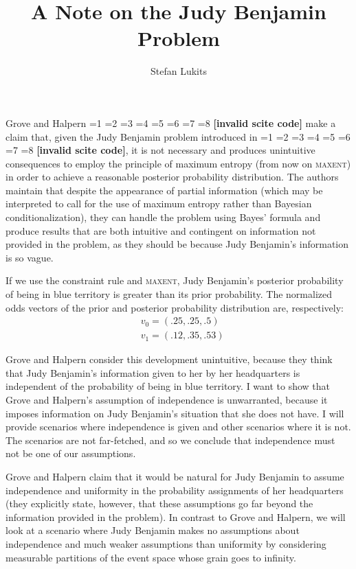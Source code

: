 \documentclass[11pt]{article}
\newcommand{\nootag}{}
\newif\ifNumericalOrYear
\newcommand{\PageP}{p.~}
\newcommand{\PageP}{}
\newcommand{\scite}[3]{\ifnum#1=1\ifNumericalOrYear\citep{#2}\else\citeyearpar{#2}\fi\else
\ifnum#1=2\ifNumericalOrYear\citep[#3]{#2}\else\citep[{\PageP}#3]{#2}\fi\else
\ifnum#1=3\ifNumericalOrYear(\citet[#3]{#2})\else\citep[{\PageP}#3]{#2}\fi\else
\ifnum#1=4\ifNumericalOrYear\citet{#2}\else\citet{#2}\fi\else
\ifnum#1=5\ifNumericalOrYear(\citet{#2})\else\citep{#2}\fi\else
\ifnum#1=6\ifNumericalOrYear(\citet[#3]{#2})\else\citep[{\PageP}#3]{#2}\fi\else
\ifnum#1=7\ifNumericalOrYear\citep{#2}\else\citealp{#2}\fi\else
\ifnum#1=8\ifNumericalOrYear\citep[#3]{#2}\else\citealp[{\PageP}#3]{#2}\fi\else
\textbf{[invalid scite code]}\fi\fi\fi\fi\fi\fi\fi\fi}
\begin{document}
\title{A Note on the Judy Benjamin Problem}

\author{Stefan Lukits}

\maketitle


\setcounter{chap}{1}

Grove and Halpern \scite{1}{grovehalpern97}{} make a claim that, given
the Judy Benjamin problem introduced in \scite{4}{fraassen81}{}, it is
not necessary and produces unintuitive consequences to employ the
principle of maximum entropy (from now on \textsc{maxent}) in order to
achieve a reasonable posterior probability distribution. The authors
maintain that despite the appearance of partial information (which may
be interpreted to call for the use of maximum entropy rather than
Bayesian conditionalization), they can handle the problem using Bayes'
formula and produce results that are both intuitive and contingent on
information not provided in the problem, as they should be because
Judy Benjamin's information is so vague.

If we use the constraint rule and \textsc{maxent}, Judy Benjamin's
posterior probability of being in blue territory is greater than its
prior probability. The normalized odds vectors of the prior and
posterior probability distribution are, respectively:
\begin{align}
&v_{0}=(.25,.25,.5)\nootag \\
&v_{1}=(.12,.35,.53)\nootag
\end{align}

Grove and Halpern consider this development unintuitive, because they
think that Judy Benjamin's information given to her by her
headquarters is independent of the probability of being in blue
territory. I want to show that Grove and Halpern's assumption of
independence is unwarranted, because it imposes information on Judy
Benjamin's situation that she does not have. I will provide scenarios
where independence is given and other scenarios where it is not. The
scenarios are not far-fetched, and so we conclude that independence
must not be one of our assumptions. 

Grove and Halpern claim that it would be natural for Judy Benjamin to
assume independence and uniformity in the probability assignments of
her headquarters (they explicitly state, however, that these
assumptions go far beyond the information provided in the problem). In
contrast to Grove and Halpern, we will look at a scenario where Judy
Benjamin makes no assumptions about independence and much weaker
assumptions than uniformity by considering measurable partitions of
the event space whose grain goes to infinity. 
\end{document}
